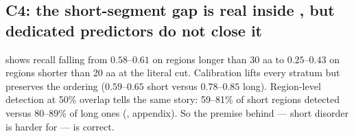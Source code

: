 \begin{table}[t]
    \centering
    \small
    \caption{Empirical calibration of the rule. The precision of \plddtrule swings from 0.95 to
    0.37 purely with the negative-set convention, while the share of all annotated disorder that
    falls below  is invariant at 0.60--0.63. Reporting one convention and calling its
    specificity ``the'' specificity is the single most consequential methodological choice in
    this literature.}
    \label{tab:calibration}
\end{table}

\subsection{C4: the short-segment gap is real inside \texorpdfstring{\plddt}{pLDDT}, but dedicated predictors do not close it}
\label{sec:c4}

  shows recall falling from
$0.58$--$0.61$ on regions longer than 30 aa to $0.25$--$0.43$ on regions shorter than 20 aa at
the literal cut. Calibration lifts every stratum but preserves the ordering
($0.59$--$0.65$ short versus $0.78$--$0.85$ long). Region-level detection at 50\% overlap tells
the same story: 59--81\% of short regions detected versus 80--89\% of long ones
(, appendix). So the premise behind \cfour --- short disorder is harder
for \plddt --- is correct.

